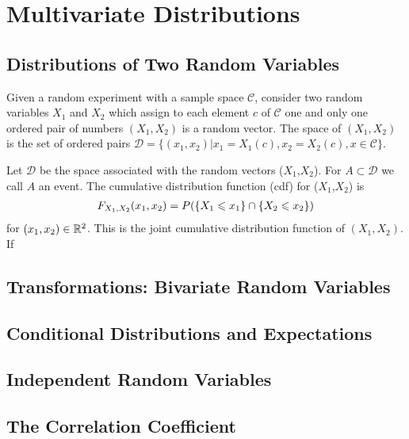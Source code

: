 \chapter{Multivariate Distributions}

\section{Distributions of Two Random Variables}

\begin{definition}{}{}
    Given a random experiment with a sample space $\mathcal{C}$,
    consider two random variables $X_1$ and $X_2$ which assign to each element $c$
    of $\mathcal{C}$ one and only one ordered pair of numbers $(X_1,X_2)$ is a random vector.
    The space of $(X_1,X_2)$ is the set of ordered pairs $\mathcal{D}=\{(x_1,x_2)|x_1=X_1(c),x_2=X_2(c),x\in\mathcal{C}\}$.
\end{definition}

\begin{definition}{}{}
    Let $\mathcal{D}$ be the space 
    associated with the random vectors ($X_1$,$X_2$).
    For $A\subset \mathcal{D}$ we call $A$ an event.
    The cumulative distribution function (cdf) for ($X_1$,$X_2$) is 
    \begin{align}
        F_{X_1,X_2}(x_1,x_2)=P(\{X_1\leqslant x_1\}\cap \{X_2\leqslant x_2\})
    \end{align}
    for $(x_1,x_2)\in \mathbb{R}^2$. This is the joint cumulative distribution function of $(X_1,X_2)$.
    If 
\end{definition}


\section{Transformations: Bivariate Random Variables}

\section{Conditional Distributions and Expectations}

\section{Independent Random Variables}

\section{The Correlation Coefficient}

